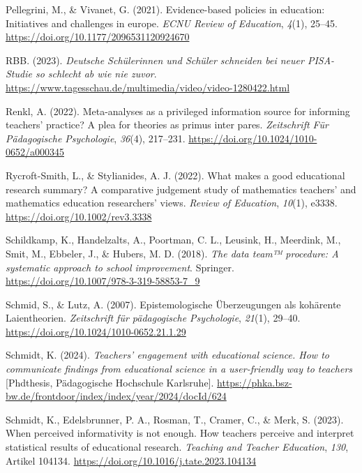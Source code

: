 \documentclass[
  jou,
  floatsintext,
  longtable,
  nolmodern,
  notxfonts,
  notimes,
  colorlinks=true,linkcolor=blue,citecolor=blue,urlcolor=blue]{apa7}
\newlength{\cslhangindent}
\newenvironment{CSLReferences}[2] %
 {\begin{list}{}{%
  \setlength{\itemindent}{0pt}
  \setlength{\leftmargin}{0pt}
  \setlength{\parsep}{0pt}
  \ifodd #1
   \setlength{\leftmargin}{\cslhangindent}
   \setlength{\itemindent}{-1\cslhangindent}
  \fi
  \setlength{\itemsep}{#2\baselineskip}}}
 {\end{list}}
\begin{document}
\begin{CSLReferences}{1}{0}
Pellegrini, M., \& Vivanet, G. (2021). Evidence-based policies in
education: {Initiatives} and challenges in europe. \emph{ECNU Review of
Education}, \emph{4}(1), 25--45.
\url{https://doi.org/10.1177/2096531120924670}

RBB. (2023). \emph{Deutsche Schülerinnen und Schüler schneiden bei neuer
PISA-Studie so schlecht ab wie nie zuvor}.
\url{https://www.tagesschau.de/multimedia/video/video-1280422.html}

Renkl, A. (2022). Meta-analyses as a privileged information source for
informing teachers' practice? A plea for theories as primus inter pares.
\emph{Zeitschrift Für Pädagogische Psychologie}, \emph{36}(4), 217--231.
\url{https://doi.org/10.1024/1010-0652/a000345}

Rycroft-Smith, L., \& Stylianides, A. J. (2022). What makes a good
educational research summary? {A} comparative judgement study of
mathematics teachers' and mathematics education researchers' views.
\emph{Review of Education}, \emph{10}(1), e3338.
\url{https://doi.org/10.1002/rev3.3338}

Schildkamp, K., Handelzalts, A., Poortman, C. L., Leusink, H., Meerdink,
M., Smit, M., Ebbeler, J., \& Hubers, M. D. (2018). \emph{The data team™
procedure: {A} systematic approach to school improvement}. Springer.
\url{https://doi.org/10.1007/978-3-319-58853-7_9}

Schmid, S., \& Lutz, A. (2007). Epistemologische Überzeugungen als
kohärente Laientheorien. \emph{Zeitschrift für pädagogische
Psychologie}, \emph{21}(1), 29--40.
\url{https://doi.org/10.1024/1010-0652.21.1.29}

Schmidt, K. (2024). \emph{Teachers' engagement with educational science.
{How} to communicate findings from educational science in a
user-friendly way to teachers} {[}Phdthesis, Pädagogische Hochschule
Karlsruhe{]}.
\url{https://phka.bsz-bw.de/frontdoor/index/index/year/2024/docId/624}

Schmidt, K., Edelsbrunner, P. A., Rosman, T., Cramer, C., \& Merk, S.
(2023). When perceived informativity is not enough. How teachers
perceive and interpret statistical results of educational research.
\emph{Teaching and Teacher Education}, \emph{130}, Artikel 104134.
\url{https://doi.org/10.1016/j.tate.2023.104134}


\end{CSLReferences}
\end{document}

